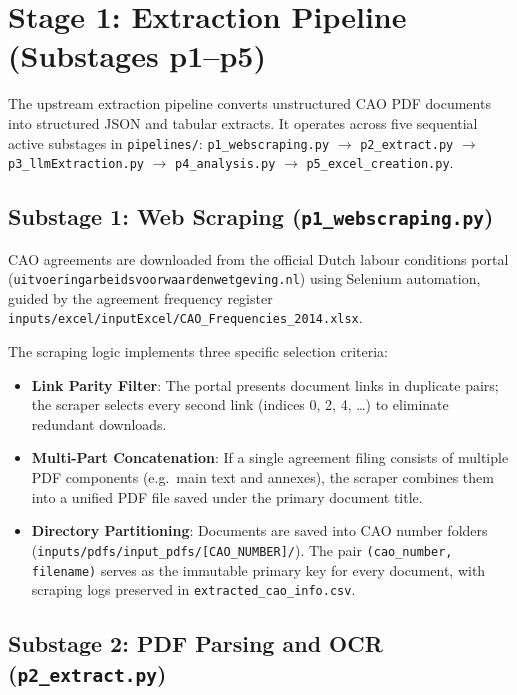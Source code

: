 \section{Stage 1: Extraction Pipeline (Substages p1--p5)}
\label{sec:extraction}

The upstream extraction pipeline converts unstructured CAO PDF documents into structured JSON and tabular extracts. It operates across five sequential active substages in \nolinkurl{pipelines/}: \texttt{p1\_webscraping.py} $\rightarrow$ \texttt{p2\_extract.py} $\rightarrow$ \texttt{p3\_llmExtraction.py} $\rightarrow$ \texttt{p4\_analysis.py} $\rightarrow$ \texttt{p5\_excel\_creation.py}.

\subsection{Substage 1: Web Scraping (\texttt{p1\_webscraping.py})}
\label{subsec:p1}

CAO agreements are downloaded from the official Dutch labour conditions portal (\nolinkurl{uitvoeringarbeidsvoorwaardenwetgeving.nl}) using Selenium automation, guided by the agreement frequency register \nolinkurl{inputs/excel/inputExcel/CAO_Frequencies_2014.xlsx}.

The scraping logic implements three specific selection criteria:
\begin{itemize}[leftmargin=1.5em]
  \item \textbf{Link Parity Filter}: The portal presents document links in duplicate pairs; the scraper selects every second link (indices 0, 2, 4, \dots) to eliminate redundant downloads.
  \item \textbf{Multi-Part Concatenation}: If a single agreement filing consists of multiple PDF components (e.g.\ main text and annexes), the scraper combines them into a unified PDF file saved under the primary document title.
  \item \textbf{Directory Partitioning}: Documents are saved into CAO number folders (\nolinkurl{inputs/pdfs/input_pdfs/[CAO_NUMBER]/}). The pair \texttt{(cao\_number, filename)} serves as the immutable primary key for every document, with scraping logs preserved in \nolinkurl{extracted_cao_info.csv}.
\end{itemize}

\subsection{Substage 2: PDF Parsing and OCR (\texttt{p2\_extract.py})}
\label{subsec:p2}

